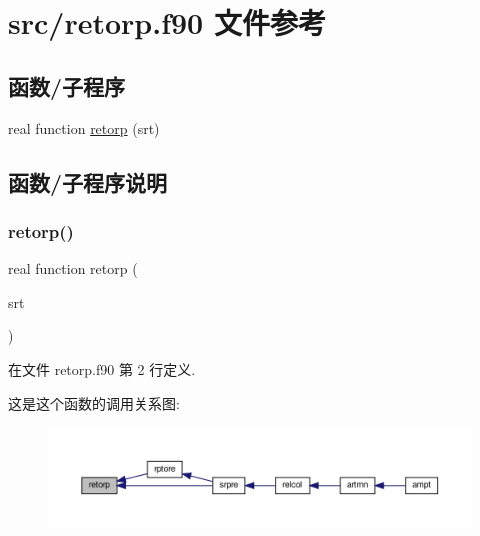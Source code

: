 \hypertarget{retorp_8f90}{}\section{src/retorp.f90 文件参考}
\label{retorp_8f90}
\subsection*{函数/子程序}
\begin{DoxyCompactItemize}
\item 
real function \mbox{\hyperlink{retorp_8f90_a73bbd7074951379c1e722c2c38ef2bba}{retorp}} (srt)
\end{DoxyCompactItemize}


\subsection{函数/子程序说明}
\mbox{\label{retorp_8f90_a73bbd7074951379c1e722c2c38ef2bba}} 
\subsubsection{\texorpdfstring{retorp()}{retorp()}}
{\footnotesize\ttfamily real function retorp (\begin{DoxyParamCaption}\item[{}]{srt }\end{DoxyParamCaption})}



在文件 retorp.\+f90 第 2 行定义.

这是这个函数的调用关系图\+:
\nopagebreak
\begin{figure}[H]
\begin{center}
\leavevmode
\includegraphics[width=350pt]{retorp_8f90_a73bbd7074951379c1e722c2c38ef2bba_icgraph}
\end{center}
\end{figure}

